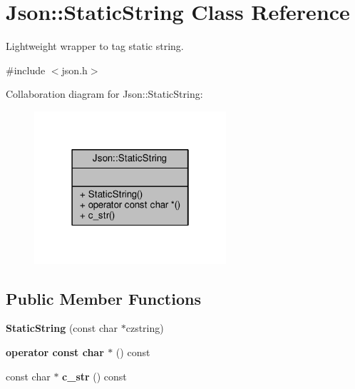 \hypertarget{classJson_1_1StaticString}{}\section{Json\+:\+:Static\+String Class Reference}
\label{classJson_1_1StaticString}


Lightweight wrapper to tag static string.  




{\ttfamily \#include $<$json.\+h$>$}



Collaboration diagram for Json\+:\+:Static\+String\+:
\nopagebreak
\begin{figure}[H]
\begin{center}
\leavevmode
\includegraphics[width=202pt]{d9/d1b/classJson_1_1StaticString__coll__graph}
\end{center}
\end{figure}
\subsection*{Public Member Functions}
\begin{DoxyCompactItemize}
\item 
{\bfseries Static\+String} (const char $\ast$czstring)\hypertarget{classJson_1_1StaticString_afb6baf1ec078ce76f0b0f9b39d19437f}{}\label{classJson_1_1StaticString_afb6baf1ec078ce76f0b0f9b39d19437f}

\item 
{\bfseries operator const char $\ast$} () const \hypertarget{classJson_1_1StaticString_ac2b334d46bbea4c0227e508fc66433e9}{}\label{classJson_1_1StaticString_ac2b334d46bbea4c0227e508fc66433e9}

\item 
const char $\ast$ {\bfseries c\+\_\+str} () const \hypertarget{classJson_1_1StaticString_ab86fc6a3183adf12fdba4b370acf1754}{}\label{classJson_1_1StaticString_ab86fc6a3183adf12fdba4b370acf1754}

\end{DoxyCompactItemize}



